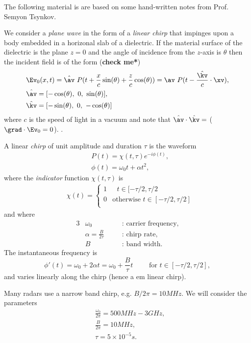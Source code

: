 \documentclass[11pt]{article}
\begin{document}
The following material is are based on some hand-written notes from Prof. Semyon Tsynkov. 

We consider a {\em plane wave} in the form of a {\em linear chirp} that impinges upon
a body embedded in a horizonal slab of a dielectric. 
If the material surface of the dielectric is the plane $z=0$ and
the angle of incidence from the $z$-axis is $\theta$ then 
the incident field is of the form ({\bf *check me*})
\begin{align*}
  & \Ev_0(x,t) = \hat\av~ P( t + \frac{x}{c} \sin(\theta) + {\frac{z}c} \cos(\theta) ) = \av~P(t - \frac{\hat{\kv}}{c}\cdot\xv), \\
  & \hat\av = [-\cos(\theta),~ 0, ~ \sin(\theta) ], \\
  & \hat{\kv} = [-\sin(\theta),~ 0, ~ -\cos(\theta) ]
\end{align*}
where $c$ is the speed of light in a vacuum and note that $\hat\av \cdot \hat\kv=$ ($\grad\cdot\Ev_0=0$). .

A linear {\em chirp} of unit amplitude and duration $\tau$ is the waveform
\begin{align*}
    & P(t) = \chi(t,\tau) e^{-i \phi(t) } , \\
    & \phi(t) =\omega_0 t +  \alpha t^2, 
\end{align*}
where the {\em indicator} function $\chi(t,\tau)$ is 
\begin{align*}
    & \chi(t) = \begin{cases}
                      1 & \text{ $t\in[-\tau/2,\tau/2$} \\
                      0 & \text{otherwise $t\in[-\tau/2,\tau/2]$} \\
                \end{cases}
\end{align*}
and where 
\begin{alignat*}{3}
&    \omega_0 && \text{: carrier frequency}, \\
&    \alpha = \frac{B}{2\tau} \quad && \text{: chirp rate}, \\
&    B        && \text{: band width}.
\end{alignat*}
The instantaneous frequency is
\[
  \phi'(t) = \omega_0 + 2\alpha t = \omega_0 + \frac{B}{\tau} t \qquad \text{ for $t\in[-\tau/2,\tau/2]$},
\]
and varies linearly along the chirp (hence a {em linear chirp}). 

Many radars use a narrow band chirp, e.g. $B/2\pi = 10MHz$. We will consider the parameters
 \begin{align*}
    & \frac{\omega_0}{2\pi} = 500 MHz - 3 GHz, \\
    &  \frac{B}{2\pi} = 10 MHz, \\
    & \tau = 5 \times 10^{-5} s. 
\end{align*}
\end{document}
